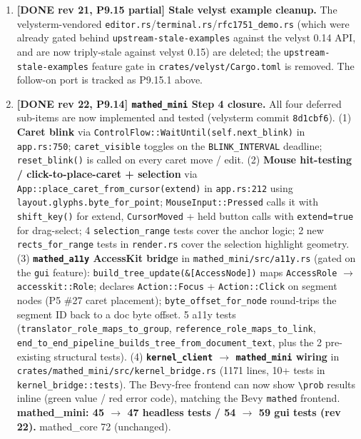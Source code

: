 \documentclass[11pt, a4paper]{article}
\begin{document}
\begin{enumerate}
\item \textbf{[DONE rev 21, P9.15 partial] Stale velyst example
  cleanup.} The velysterm-vendored
  \texttt{editor.rs}/\texttt{terminal.rs}/\texttt{rfc1751\_demo.rs}
  (which were already gated behind \texttt{upstream-stale-examples}
  against the velyst 0.14 API, and are now triply-stale against
  velyst 0.15) are deleted; the \texttt{upstream-stale-examples}
  feature gate in \texttt{crates/velyst/Cargo.toml} is removed.
  The follow-on port is tracked as P9.15.1 above.

\item \textbf{[DONE rev 22, P9.14] \texttt{mathed\_mini} Step 4
  closure.} All four deferred sub-items are now implemented and
  tested (velysterm commit \texttt{8d1cbf6}). (1) \textbf{Caret blink}
  via \texttt{ControlFlow::WaitUntil(self.next\_blink)} in
  \texttt{app.rs:750}; \texttt{caret\_visible} toggles on the
  \texttt{BLINK\_INTERVAL} deadline; \texttt{reset\_blink()} is called
  on every caret move / edit. (2) \textbf{Mouse hit-testing /
  click-to-place-caret + selection} via
  \texttt{App::place\_caret\_from\_cursor(extend)} in \texttt{app.rs:212}
  using \texttt{layout.glyphs.byte\_for\_point};
  \texttt{MouseInput::Pressed} calls it with \texttt{shift\_key()} for
  extend, \texttt{CursorMoved} + held button calls with
  \texttt{extend=true} for drag-select; 4 \texttt{selection\_range} tests
  cover the anchor logic; 2 new \texttt{rects\_for\_range} tests in
  \texttt{render.rs} cover the selection highlight geometry.
  (3) \textbf{\texttt{mathed\_a11y} AccessKit bridge} in
  \texttt{mathed\_mini/src/a11y.rs} (gated on the \texttt{gui} feature):
  \texttt{build\_tree\_update(\&[AccessNode])} maps
  \texttt{AccessRole} $\to$ \texttt{accesskit::Role}; declares
  \texttt{Action::Focus} + \texttt{Action::Click} on segment nodes
  (P5 \#27 caret placement); \texttt{byte\_offset\_for\_node} round-trips
  the segment ID back to a doc byte offset. 5 a11y tests
  (\texttt{translator\_role\_maps\_to\_group},
  \texttt{reference\_role\_maps\_to\_link},
  \texttt{end\_to\_end\_pipeline\_builds\_tree\_from\_document\_text},
  plus the 2 pre-existing structural tests). (4) \textbf{\texttt{kernel\_client}
  $\to$ \texttt{mathed\_mini} wiring} in
  \texttt{crates/mathed\_mini/src/kernel\_bridge.rs} (1171 lines,
  10+ tests in \texttt{kernel\_bridge::tests}). The Bevy-free frontend
  can now show \texttt{\textbackslash prob} results inline (green value
  / red error code), matching the Bevy \texttt{mathed} frontend.
  \textbf{mathed\_mini: 45 $\to$ 47 headless tests / 54 $\to$ 59 gui
  tests (rev 22).} mathed\_core 72 (unchanged).


\end{enumerate}
\end{document}
